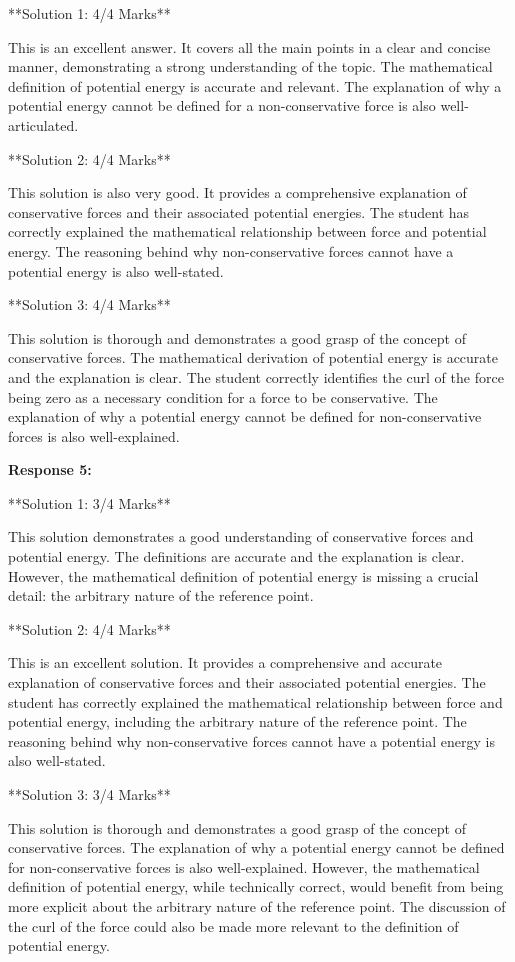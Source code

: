 \documentclass[a4paper,11pt]{article}
\begin{document}
**Solution 1: 4/4 Marks**

This is an excellent answer. It covers all the main points in a clear and concise manner, demonstrating a strong understanding of the topic. The mathematical definition of potential energy is accurate and relevant. The explanation of why a potential energy cannot be defined for a non-conservative force is also well-articulated.

**Solution 2: 4/4 Marks**

This solution is also very good. It provides a comprehensive explanation of conservative forces and their associated potential energies. The student has correctly explained the mathematical relationship between force and potential energy. The reasoning behind why non-conservative forces cannot have a potential energy is also well-stated.

**Solution 3: 4/4 Marks**

This solution is thorough and demonstrates a good grasp of the concept of conservative forces. The mathematical derivation of potential energy is accurate and the explanation is clear. The student correctly identifies the curl of the force being zero as a necessary condition for a force to be conservative. The explanation of why a potential energy cannot be defined for non-conservative forces is also well-explained.

\textbf{Response 5:}

**Solution 1: 3/4 Marks**

This solution demonstrates a good understanding of conservative forces and potential energy. The definitions are accurate and the explanation is clear. However, the mathematical definition of potential energy is missing a crucial detail: the arbitrary nature of the reference point. 

**Solution 2: 4/4 Marks**

This is an excellent solution. It provides a comprehensive and accurate explanation of conservative forces and their associated potential energies. The student has correctly explained the mathematical relationship between force and potential energy, including the arbitrary nature of the reference point. The reasoning behind why non-conservative forces cannot have a potential energy is also well-stated.

**Solution 3: 3/4 Marks**

This solution is thorough and demonstrates a good grasp of the concept of conservative forces. The explanation of why a potential energy cannot be defined for non-conservative forces is also well-explained. However, the mathematical definition of potential energy, while technically correct, would benefit from being more explicit about the arbitrary nature of the reference point. The discussion of the curl of the force could also be made more relevant to the definition of potential energy. 
\end{document}
